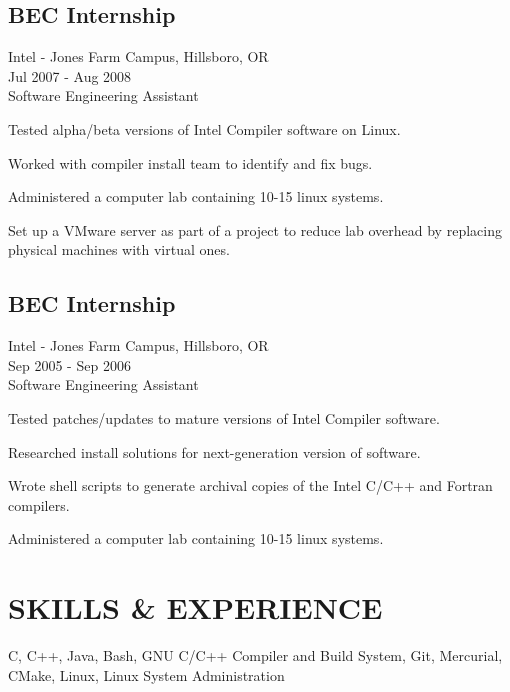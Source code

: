 \documentclass{article}
\newcommand{\skills}{C, C++, Java, Bash, GNU C/C++ Compiler and Build System, Git, Mercurial, CMake, Linux, Linux System Administration}
\renewenvironment{itemize}{
	\begin{list}{}{
		\setlength{\leftmargin}{1.5em}
		\setlength{\itemsep}{0.25em}
		\setlength{\parskip}{0pt}
		\setlength{\parsep}{0.25em}
	}
}{
	\end{list}
}
\begin{document}
	\begin{minipage}[t]{0.5\textwidth}
	\subsection*{BEC Internship}
		Intel - Jones Farm Campus, Hillsboro, OR \\
		Jul 2007 - Aug 2008 \\
		Software Engineering Assistant

		\begin{itemize}
			\item Tested alpha/beta versions of Intel Compiler software on Linux.
			\item Worked with compiler install team to identify and fix bugs.
			\item Administered a computer lab containing 10-15 linux systems.
			\item Set up a VMware server as part of a project to reduce lab overhead by
				replacing physical machines with virtual ones.
		\end{itemize}
	\end{minipage}
	\hspace{2 mm}
	\begin{minipage}[t]{0.5\textwidth}
	\subsection*{BEC Internship}
		Intel - Jones Farm Campus, Hillsboro, OR \\
		Sep 2005 - Sep 2006 \\
		Software Engineering Assistant

		\begin{itemize}
			\item Tested patches/updates to mature versions of Intel Compiler software.
			\item Researched install solutions for next-generation version of software.
			\item Wrote shell scripts to generate archival copies of the Intel C/C++ and Fortran compilers.
			\item Administered a computer lab containing 10-15 linux systems.
		\end{itemize}
	\end{minipage}


\section*{SKILLS \& EXPERIENCE}
	\skills
\end{document}
